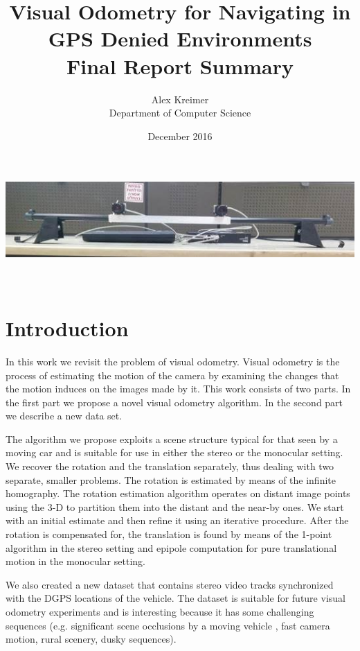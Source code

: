 \documentclass{report}
\title{%
  Visual Odometry for Navigating in GPS Denied Environments\\[1in]
  \large Final Report Summary}
\date {December 2016}
\author{Alex Kreimer \\[1in] Department of Computer Science }
\begin{document}
\makeatletter
\begin{titlepage}
  \begin{center}
    \includegraphics[width=0.7\linewidth]{title_cams}\\[4ex]
    {\huge \bfseries  \@title }\\[4ex] 
    {\LARGE  \@author}\\[50ex] 
  \end{center}
\end{titlepage}
\makeatother
\thispagestyle{empty}
\newpage

\section{Introduction}
In this work we revisit the problem of visual odometry. Visual
odometry is the process of estimating the motion of the camera by
examining the changes that the motion induces on the images made by
it. This work consists of two parts. In the first part we propose a
novel visual odometry algorithm.  In the second part we describe a
new data set.

The algorithm we propose exploits a scene structure typical for that
seen by a moving car and is suitable for use in either the stereo or
the monocular setting.  We recover the rotation and the translation
separately, thus dealing with two separate, smaller problems. The
rotation is estimated by means of the infinite homography. The
rotation estimation algorithm operates on distant image points using
the 3-D to partition them into the distant and the near-by ones. We
start with an initial estimate and then refine it using an iterative
procedure. After the rotation is compensated for, the translation is
found by means of the 1-point algorithm in the stereo setting and
epipole computation for pure translational motion in the monocular
setting.

We also created a new dataset that contains stereo video tracks
synchronized with the DGPS locations of the vehicle.  The dataset is
suitable for future visual odometry experiments and is interesting
because it has some challenging sequences (e.g. significant scene
occlusions by a moving vehicle , fast camera motion, rural scenery,
dusky sequences).
\end{document}
